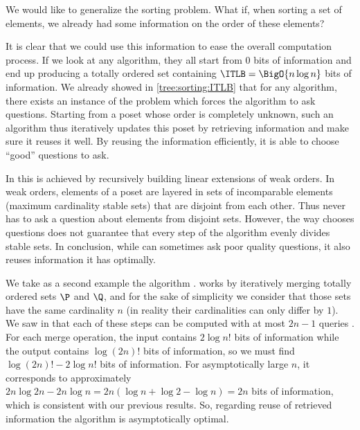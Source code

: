 
We would like to generalize the sorting problem. What if, when sorting a set of
elements, we already had some information on the order of these elements?


It is clear that we could use this information to ease the overall computation
process. If we look at any \BigO{\ITLB} algorithm, they all start from
$0$ bits of information and end up producing a totally ordered set containing
$\ITLB = \BigO{n \log n}$ bits of information. We already showed in
\ref{tree:sorting:ITLB} that for any algorithm, there exists an instance of the
problem which forces the algorithm to ask  questions.
Starting from a poset whose order is completely unknown, such an algorithm
thus iteratively updates this poset by retrieving information and make sure it
reuses it well. By reusing the information efficiently, it is able to
choose ``good'' questions to ask.


In \quicksort this is achieved by recursively building linear extensions of weak
orders. In weak orders, elements of a poset are layered in sets of incomparable
elements (maximum cardinality stable sets) that are disjoint from each other.
Thus \quicksort never has to ask a question about elements from disjoint
sets. However, the way \quicksort chooses questions does not guarantee that every
step of the algorithm evenly divides stable sets. In conclusion, while
\quicksort can sometimes ask poor quality questions, it also reuses information
it has optimally.


We take as a second example the algorithm \mergesort. \mergesort works by
iteratively merging totally ordered sets $\P$ and $\Q$, and for the sake of
simplicity we consider that those sets have the same cardinality $n$  (in
reality their cardinalities can only differ by $1$). We saw in
 that each of these steps can be computed with at most
\(2n-1\) queries . For each merge operation, the input
contains $2 \log n!$ bits of information while the output contains $\log (2n)!$
bits of information, so we must find \(\log (2n)! - 2 \log n!\) bits of
information. For asymptotically large \(n\), it corresponds to approximately \(2n \log 2n -
2n \log n = 2n (\log n + \log 2 - \log n) = 2n\) bits of information, which is
consistent with our previous results. So, regarding reuse of retrieved
information the \mergesort algorithm is asymptotically optimal.

